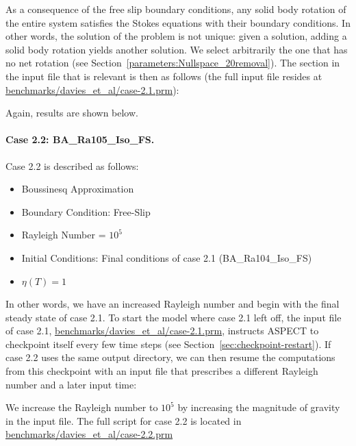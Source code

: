 \documentclass{article}
\newcommand{\aspect}{\textsc{ASPECT}}
\begin{document}
As a consequence of the free slip boundary conditions, any solid body rotation
of the entire system satisfies the Stokes equations with their boundary
conditions. In other words, the solution of the problem is not unique: given a
solution, adding a solid body rotation yields another solution. We select
arbitrarily the one that has no net rotation (see
Section~\ref{parameters:Nullspace_20removal}). The section in the input file
that is relevant is then as follows (the full input file resides at
\url{benchmarks/davies_et_al/case-2.1.prm}):



Again, results are shown below.


\paragraph{Case 2.2: BA\_Ra105\_Iso\_FS.}
\label{sec:davies-case22_BA}

Case 2.2 is described as follows:
\begin{itemize}
\item Boussinesq Approximation
\item Boundary Condition: Free-Slip
\item Rayleigh Number = $10^5$ 
\item Initial Conditions: Final conditions of case 2.1 (BA\_Ra104\_Iso\_FS)
\item $\eta(T) = 1$
\end{itemize}
In other words, we have an increased Rayleigh number and begin with the final
steady state of case 2.1. To start the model where case 2.1 left off, the
input file of case 2.1, \url{benchmarks/davies_et_al/case-2.1.prm}, instructs
\aspect{} to checkpoint itself every few time steps (see
Section~\ref{sec:checkpoint-restart}). If case 2.2 uses the same
output directory, we can then resume the computations from this checkpoint with
an input file that prescribes a different Rayleigh number and a later input time:



We increase the Rayleigh number to $10^5$ by increasing the magnitude of
gravity in the input file.  The full script for case 2.2 is located in
\url{benchmarks/davies_et_al/case-2.2.prm}
\end{document}
